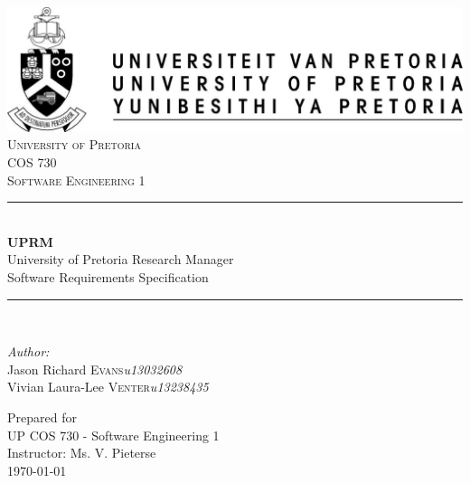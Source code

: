 \documentclass[12pt, a4paper]{article}
\begin{document}
	\begin{titlepage}
		\newcommand{\HRule}{\rule{\linewidth}{0.5mm}}
		\center
		
		\includegraphics{up-logo.jpg} \\[1cm]
		
		\textsc{\LARGE University of Pretoria}\\[1.5cm]
		\textsc{\Large COS 730}\\[0.5cm]
		\textsc{\large Software Engineering 1}\\[0.5cm]

		\HRule \\[0.4cm]
		{ \huge \bfseries UPRM}\\[0.4cm]
		{\large University of Pretoria Research Manager}\\
		{Software Requirements Specification}\\

		\HRule \\[1.5cm]
		
		\begin{minipage}{1\textwidth}
			\begin{flushleft} \large
				\emph{Author:}\\
				Jason Richard \textsc{Evans}\hfill \emph{u13032608}\\
				Vivian Laura-Lee \textsc{Venter}\hfill \emph{u13238435} \\[1cm]
			\end{flushleft}
		\end{minipage}
		
		\vfill
		Prepared for \\
		UP COS 730 - Software Engineering 1 \\
		Instructor: Ms. V. Pieterse \\
		{\large \today}\\[6cm]
	\end{titlepage}

	\tableofcontents
	\pagebreak

	
	\pagebreak

	
	\pagebreak

	
\end{document}
